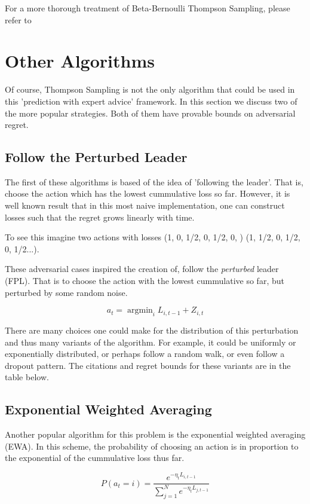 \documentclass[10pt,a4paper]{article} %
\DeclareMathOperator*{\argmin}{argmin}
\begin{document}
	For a more thorough treatment of Beta-Bernoulli Thompson Sampling, please refer to \cite{agrawal}
	
	
	\section{Other Algorithms}
	
	Of course, Thompson Sampling is not the only algorithm that could be used in this 'prediction with expert advice' framework.  In this section we discuss two of the more popular strategies.  Both of them have provable bounds on adversarial regret.
	
	\subsection{Follow the Perturbed Leader}
	
	The first of these algorithms is based of the idea of 'following the leader'.  That is, choose the action which has the lowest cummulative loss so far.  However, it is well known result that in this most naive implementation, one can construct losses such that the regret grows linearly with time.
	
	To see this imagine two actions with losses (1, 0, 1/2, 0, 1/2, 0, ) (1, 1/2, 0, 1/2, 0, 1/2...).
	
	These adversarial cases inspired the creation of, follow the \textit{perturbed} leader (FPL).  That is to choose the action with the lowest cummulative so far, but perturbed by some random noise.
	
	$$a_t = \argmin_i L_{i, t-1} + Z_{i, t}$$
	
	There are many choices one could make for the distribution of this perturbation and thus many variants of the algorithm.  For example, it could be uniformly or exponentially distributed, or perhaps follow a random walk, or even follow a dropout pattern.  The citations and regret bounds for these variants are in the table below.
	
	\subsection{Exponential Weighted Averaging}
	
	Another popular algorithm for this problem is the exponential weighted averaging (EWA).  In this scheme, the probability of choosing an action is in proportion to the exponential of the cummulative loss thus far. 
	
	$$P(a_t = i) = \frac{e^{-\eta_t L_{i, t - 1}}}{\sum_{j = 1}^N  e^{-\eta_t L_{j, t - 1}}}$$
	
\end{document}
